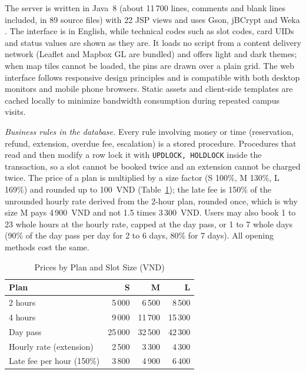 The server is written in Java~8 (about 11\,700 lines, comments and blank lines included, in 89 source files) with
22 JSP views and uses Gson, jBCrypt \cite{provos1999bcrypt} and Weka \cite{hall2009weka}. The interface is in English,
while technical codes such as slot codes, card UIDs and status values are shown as they are. It loads no script from a
content delivery network (Leaflet and Mapbox GL are bundled) and offers light and dark themes; when map tiles cannot be
loaded, the pins are drawn over a plain grid. The web interface follows responsive design principles and is compatible with
both desktop monitors and mobile phone browsers. Static assets and client-side templates are cached locally to minimize
bandwidth consumption during repeated campus visits.

\textit{Business rules in the database.} Every rule involving money or time (reservation, refund, extension,
overdue fee, escalation) is a stored procedure. Procedures that read and then modify a row lock it with
\texttt{UPDLOCK, HOLDLOCK} inside the transaction, so a slot cannot be booked twice and an extension cannot be charged
twice. The price of a plan is multiplied by a size factor (S 100\%, M 130\%, L 169\%) and rounded up to 100~VND
(Table~\ref{tab:price}); the late fee is 150\% of the unrounded hourly rate derived from the 2-hour plan, rounded once,
which is why size M pays 4\,900~VND and not 1.5 times 3\,300~VND. Users may also book 1 to 23 whole hours at the hourly
rate, capped at the day pass, or 1 to 7 whole days (90\% of the day pass per day for 2 to 6 days, 80\% for 7 days).
All opening methods cost the same.

\begin{table}[!htbp]
\renewcommand{\arraystretch}{1.1}
\centering
\small
\caption{Prices by Plan and Slot Size (VND)}
\label{tab:price}
\begin{tabular}{l r r r}
\hline
Plan & S & M & L \\
\hline
2 hours & 5\,000 & 6\,500 & 8\,500 \\
4 hours & 9\,000 & 11\,700 & 15\,300 \\
Day pass & 25\,000 & 32\,500 & 42\,300 \\
Hourly rate (extension) & 2\,500 & 3\,300 & 4\,300 \\
Late fee per hour (150\%) & 3\,800 & 4\,900 & 6\,400 \\
\hline
\end{tabular}
\end{table}

